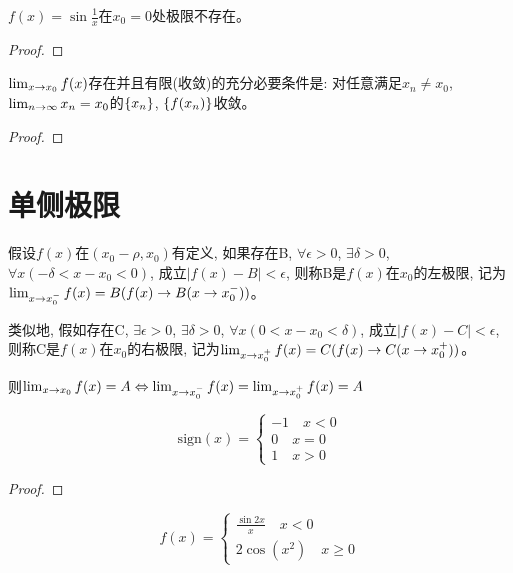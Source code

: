 \documentclass[lang=cn]{elegantbook}
\begin{document}
\begin{proposition}
    $f(x) = \sin \frac{1}{x}$在$x_0 = 0$处极限不存在。
\end{proposition}
\begin{proof}
    
\end{proof}

\begin{lemma}
    $\lim_{x \to x_0 } f(x)$存在并且有限(收敛)的充分必要条件是: 对任意满足$x_n \neq x_0$, $\lim_{n \to \infty } x_n = x_0$的$\left\{ x_n\right\}$, $\left\{ f(x_n)\right\}$收敛。
\end{lemma}
\begin{proof}
    
\end{proof}

\section{单侧极限}
\begin{definition}
    假设$f(x)$在$(x_0 - \rho, x_0)$有定义, 如果存在B, $\forall \epsilon > 0$, $\exists \delta > 0$, $\forall x(-\delta < x-x_0 < 0)$, 成立$\left| f(x) - B\right| < \epsilon$, 则称B是$f(x)$在$x_0$的左极限, 记为$\lim_{x \to x_0^- } f(x) = B(f(x)\to B(x \to x_0^-))$。

    类似地, 假如存在C, $\exists \epsilon > 0$, $\exists \delta > 0$, $\forall x(0 < x - x_0 < \delta )$, 成立$\left| f(x) - C \right| < \epsilon$, 则称C是$f(x)$在$x_0$的右极限, 记为$\lim_{x \to x_0^+ } f(x) = C(f(x)\to C(x \to x_0^+))$。

    则$\lim_{x \to x_0 } f(x) = A \Leftrightarrow \lim_{x \to x_0^- } f(x) = \lim_{x \to x_0^+ } f(x) = A$
\end{definition}

\begin{proposition}
    \begin{equation*}
        \mathrm{sign} (x) = \left\{ 
            \begin{aligned}
                -1 \quad x < 0 \\
                0 \quad x = 0 \\
                1 \quad x > 0 
            \end{aligned}
        \right.
    \end{equation*}
\end{proposition}
\begin{proof}
    
\end{proof}
\begin{proposition}
    \begin{equation*}
        f(x) = \left\{
            \begin{aligned}
               \frac{\sin 2x}{x} \quad x < 0 \\
               2\cos(x^2) \quad x \ge 0 
            \end{aligned}
        \right.
    \end{equation*}
\end{proposition}
\end{document}
